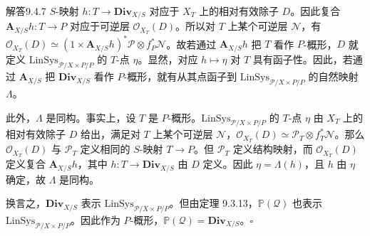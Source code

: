 \begin{origstatement}{解答}{9.4.7}\label{appA:ans947}
$S$-映射 $h\colon T\to\mathbf{Div}_{X/S}$ 对应于 $X_T$ 上的相对有效除子 $D$。因此复合 $\mathbf A_{X/S}h\colon T\to P$ 对应于可逆层 $\mathcal O_{X_T}(D)$。所以对 $T$ 上某个可逆层 $\mathcal N$，有 $\mathcal O_{X_T}(D)\simeq(1\times\mathbf A_{X/S}h)^*\mathcal P\otimes f_P^*\mathcal N$。故若通过 $\mathbf A_{X/S}h$ 把 $T$ 看作 $P$-概形，$D$ 就定义 $\mathrm{LinSys}_{\mathcal P/X\times P/P}$ 的 $T$-点 $\eta$。显然，对应 $h\mapsto\eta$ 对 $T$ 具有函子性。因此，若通过 $\mathbf A_{X/S}$ 把 $\mathbf{Div}_{X/S}$ 看作 $P$-概形，就有从其点函子到 $\mathrm{LinSys}_{\mathcal P/X\times P/P}$ 的自然映射 $\Lambda$。

此外，$\Lambda$ 是同构。事实上，设 $T$ 是 $P$-概形。$\mathrm{LinSys}_{\mathcal P/X\times P/P}$ 的 $T$-点 $\eta$ 由 $X_T$ 上的相对有效除子 $D$ 给出，满足对 $T$ 上某个可逆层 $\mathcal N$，$\mathcal O_{X_T}(D)\simeq\mathcal P_T\otimes f_T^*\mathcal N$。那么 $\mathcal O_{X_T}(D)$ 与 $\mathcal P_T$ 定义相同的 $S$-映射 $T\to P$。但 $\mathcal P_T$ 定义结构映射，而 $\mathcal O_{X_T}(D)$ 定义复合 $\mathbf A_{X/S}h$，其中 $h\colon T\to\mathbf{Div}_{X/S}$ 由 $D$ 定义。因此 $\eta=\Lambda(h)$，且 $h$ 由 $\eta$ 确定，故 $\Lambda$ 是同构。

换言之，$\mathbf{Div}_{X/S}$ 表示 $\mathrm{LinSys}_{\mathcal P/X\times P/P}$。但由定理 9.3.13，$\mathbb P(\mathcal Q)$ 也表示 $\mathrm{LinSys}_{\mathcal P/X\times P/P}$。因此作为 $P$-概形，$\mathbb P(\mathcal Q)=\mathbf{Div}_{X/S}$。\hfill$\square$
\end{origstatement}

